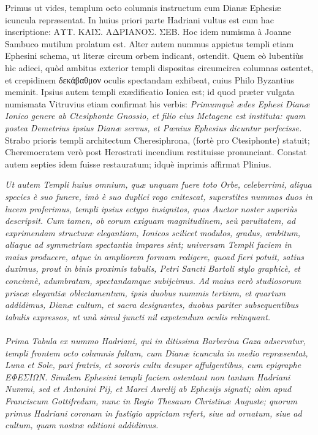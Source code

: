 \documentclass[a4paper, 11pt, oneside, polutonikogreek, latin]{article}
\begin{document}
Primus ut vides, templum octo columnis instructum cum Dianæ Ephesiæ icuncula repræsentat. In huius priori parte Hadriani vultus est cum hac inscriptione: \foreignlanguage{greek}{ΑΥΤ. ΚΑΙΣ. ΑΔΡΙΑΝΟΣ. ΣΕΒ.} Hoc idem numisma à Joanne Sambuco mutilum prolatum est. Alter autem nummus appictus templi etiam Ephesini schema, ut literæ circum orbem indicant, ostendit. Quem eò lubentiùs hìc adieci, quòd ambitus exterior templi dispositas circumcirca columnas ostentet, et crepidinem δεκάβαθμον oculis spectandam exhibeat, cuius Philo Byzantius meminit. Ipsius autem templi exædificatio Ionica est; id quod præter vulgata numismata Vitruvius etiam confirmat his verbis: \emph{Primumquè ædes Ephesi Dianæ Ionico genere ab Ctesiphonte Gnossio, et filio eius Metagene est instituta: quam postea Demetrius ipsius Dianæ servus, et Pœnius Ephesius dicuntur perfecisse.} Strabo prioris templi architectum Cheresiphrona, (fortè pro Ctesiphonte) statuit; Cheremocratem verò post Herostrati incendium restituisse pronunciant. Constat autem septies idem fuisse restauratum; idquè inprimis affirmat Plinius.

\emph{Ut autem Templi huius omnium, quæ unquam fuere toto Orbe, celeberrimi, aliqua species è suo funere, imò è suo duplici rogo enitescat, superstites nummos duos in lucem proferimus, templi ipsius ectypo insignitos, quos Auctor noster superiùs descripsit. Cum tamen, ob eorum exiguam magnitudinem, seù paruitatem, ad exprimendam structuræ elegantiam, Ionicos scilicet modulos, gradus, ambitum, aliaque ad symmetriam spectantia impares sint; universam Templi faciem in maius producere, atque in ampliorem formam redigere, quoad fieri potuit, satius duximus, prout in binis proximis tabulis, Petri Sancti Bartoli stylo graphicè, et concinnè, adumbratam, spectandamque subijcimus. Ad maius verò studiosorum priscæ elegantiæ oblectamentum, ipsis duobus nummis tertium, et quartum addidimus, Dianæ cultum, et sacra designantes, duobus pariter subsequentibus tabulis expressos, ut unà simul juncti nil expetendum oculis relinquant.}
\clearpage
\paragraph{}
\emph{Prima Tabula ex nummo Hadriani, qui in ditissima Barberina Gaza adservatur, templi frontem octo columnis fultam, cum Dianæ icuncula in medio repræsentat, Luna et Sole, pari fratris, et sororis cultu desuper affulgentibus, cum epigraphe \foreignlanguage{greek}{ΕΦΕΣΙΩΝ}. Similem Ephesini templi faciem ostentant non tantum Hadriani Nummi, sed et Antonini Pij, et Marci Aurelij ab Ephesijs signati; olim apud Franciscum Gottifredum, nunc in Regio Thesauro Christinæ Auguste; quorum primus Hadriani coronam in fastigio appictam refert, siue ad ornatum, siue ad cultum, quam nostræ editioni addidimus.}
\end{document}

